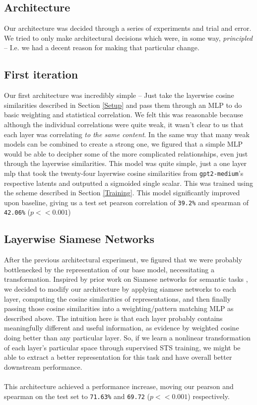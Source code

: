 \documentclass[14pt, twocolumn]{article}
\begin{document}
\subsection{Architecture}
Our architecture was decided through a series of experiments and trial and error. We tried to only make architectural decisions which were, in some way, \textit{principled} -- I.e. we had a decent reason for making that particular change.

\subsection{First iteration}
Our first architecture was incredibly simple -- Just take the layerwise cosine similarities described in Section \ref {Setup} and pass them through an MLP to do basic weighting and statistical correlation. We felt this was reasonable because although the individual correlations were quite weak, it wasn't clear to us that each layer was correlating \textit{to the same content}. In the same way that many weak models can be combined to create a strong one, we figured that a simple MLP would be able to decipher some of the more complicated relationships, even just through the layerwise similarities. This model was quite simple, just a one layer mlp that took the twenty-four layerwise cosine similarities from \verb|gpt2-medium|'s respective latents and outputted a sigmoided single scalar. This was trained using the scheme described in Section \ref{Training}. This model significantly improved upon baseline, giving us a test set pearson correlation of \verb|39.2%| and spearman of \verb|42.06%| ($p<< 0.001$)

\subsection{Layerwise Siamese Networks}
After the previous architectural experiment, we figured that we were probably bottlenecked by the representation of our base model, necessitating a transformation. Inspired by prior work on Siamese networks for semantic tasks \cite{reimers2019sentencebertsentenceembeddingsusing}, we decided to modify our architecture by applying siamese networks to each layer, computing the cosine similarities of  representations, and then finally passing those cosine similarities into a weighting/pattern matching MLP as described above. The intuition here is that each layer probably contains meaningfully different and useful information, as evidence by weighted cosine doing better than any particular layer. So, if we learn a nonlinear transformation of each layer's particular space through supervised STS training, we might be able to extract a better representation for this task and have overall better downstream performance.\\\\
This architecture achieved a  performance increase, moving our pearson and spearman on the test set to \verb|71.63%| and \verb|69.72| ($p << 0.001$) respectively.
\end{document}
